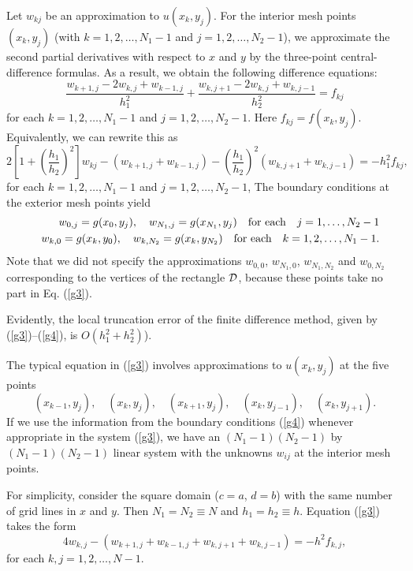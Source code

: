 Let $w_{kj}$ be an approximation to $u(x_{k}, y_{j})$.
For the interior mesh points $(x_{k}, y_{j})$ (with
$k=1,2,\dots,N_{1}-1$ and $j=1,2,\dots,N_{2}-1$), we approximate
the second partial derivatives with respect to $x$ and $y$
by the three-point central-difference formulas. As a result, we obtain the following
difference equations:
\[
\frac{w_{k+1,j}-2w_{k,j}+w_{k-1,j}}{h_{1}^{2}}+
\frac{w_{k,j+1}-2w_{k,j}+w_{k,j-1}}{h_{2}^{2}}=f_{kj}
\]
for each $k=1,2,\dots,N_{1}-1$ and $j=1,2,\dots,N_{2}-1$.
Here $f_{kj}=f(x_{k}, y_{j})$. Equivalently, we can rewrite
this as
\begin{equation}
2\left[1+\left(\frac{h_{1}}{h_{2}}\right)^{2}\right]w_{kj}-\left(w_{k+1,j}+w_{k-1,j}\right)
-\left(\frac{h_{1}}{h_{2}}\right)^{2}\left(w_{k,j+1}+w_{k,j-1}\right)
=-h_{1}^{2}f_{kj}, \label{g3}
\end{equation}
for each $k=1,2,\dots,N_{1}-1$ and $j=1,2,\dots,N_{2}-1$,
The boundary conditions at the
exterior mesh points yield
\begin{eqnarray}
&&w_{0,j}=g(x_{0}, y_{j}), \quad w_{N_{1},j}=g(x_{N_{1}}, y_{j})
\quad \hbox{for each} \quad j=1,\dots,N_{2}-1 \label{g4} \\
&&w_{k,0}=g(x_{k}, y_{0}), \quad w_{k,N_{2}}=g(x_{k}, y_{N_{2}})
\quad \hbox{for each} \quad k=1,2,\dots,N_{1}-1.\nonumber  
\end{eqnarray}
Note that we did not specify the approximations $w_{0,0}$,
$w_{N_{1},0}$, $w_{N_{1},N_{2}}$ and $w_{0,N_{2}}$ corresponding to
the vertices of the rectangle ${\cal D}$, because these points take
no part in Eq. (\ref{g3}).

 
Evidently, the local truncation
error of the finite difference method, given by (\ref{g3})--(\ref{g4}), is $O(h_{1}^{2}+h_{2}^{2})$).

 
The typical equation in (\ref{g3}) involves approximations to $u(x_{k}, y_{j})$ at the five
points
\[
(x_{k-1}, y_{j}), \quad (x_{k}, y_{j}), \quad (x_{k+1}, y_{j}), \quad
(x_{k}, y_{j-1}), \quad (x_{k}, y_{j+1}).
\]
If we use the information from the boundary conditions (\ref{g4})
whenever appropriate in the system (\ref{g3}), we have an
$(N_{1}-1)(N_{2}-1)$ by $(N_{1}-1)(N_{2}-1)$ linear system with
the unknowns $w_{ij}$ at the interior mesh points.

 
For simplicity, consider the square domain ($c=a$, $d=b$) with the same number of grid lines
in $x$ and $y$. Then $N_{1}=N_{2}\equiv N$ and $h_{1}=h_{2}\equiv h$. Equation (\ref{g3})
takes the form
\begin{equation}
4w_{k,j}-\left(w_{k+1,j}+w_{k-1,j}+w_{k,j+1}+w_{k,j-1}\right)
=-h^{2}f_{k,j}, \label{g5}
\end{equation}
for each $k,j=1,2,\dots,N-1$.

